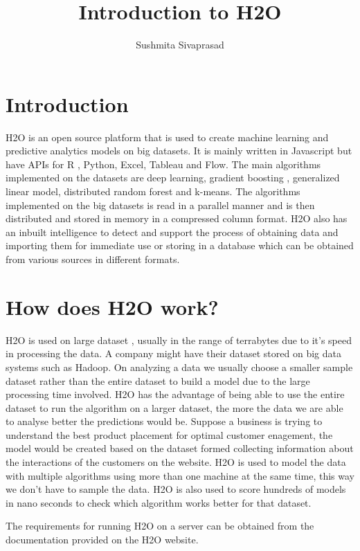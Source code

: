 \documentclass[9pt,twocolumn,twoside]{../../styles/osajnl}
\title{Introduction to H2O}
\author[1]{Sushmita Sivaprasad}
\affil[1]{School of Informatics and Computing, Bloomington, IN 47408, U.S.A.}
\affil[*]{ sushsiva@umail.iu.edu}
\begin{document}
\maketitle

\section{Introduction}

H2O is an open source platform that is used to create machine learning
and predictive analytics models on big datasets. It is mainly written
in Javascript but have APIs for R , Python, Excel, Tableau and
Flow\cite{www-h2o-webpage}. The main algorithms implemented on the
datasets are deep learning, gradient boosting , generalized linear
model, distributed random forest and k-means. The algorithms
implemented on the big datasets is read in a parallel manner and is
then distributed and stored in memory in a compressed column
format. H2O also has an inbuilt intelligence to detect and support the
process of obtaining data and importing them for immediate use or
storing in a database which can be obtained from various sources in
different formats\cite{www-h2o-webpage}.


\section{How does H2O work?}

H2O is used on large dataset , usually in the range of terrabytes due
to it's speed in processing the data. A company might have their
dataset stored on big data systems such as Hadoop. On analyzing a data
we usually choose a smaller sample dataset rather than the entire
dataset to build a model due to the large processing time
involved. H2O has the advantage of being able to use the entire
dataset to run the algorithm on a larger dataset, the more the data we
are able to analyse better the predictions would
be\cite{www-h2oyoutubevideo}. Suppose a business is trying to
understand the best product placement for optimal customer enagement,
the model would be created based on the dataset formed collecting
information about the interactions of the customers on the
website. H2O is used to model the data with multiple algorithms using
more than one machine at the same time, this way we don’t have to
sample the data\cite{www-h2oyoutubevideo}. H2O is also used to score
hundreds of models in nano seconds to check which algorithm works
better for that dataset.

The requirements for running H2O on a server can be obtained from the documentation provided on the H2O website\cite{www-h2o-requirements}.
\end{document}
